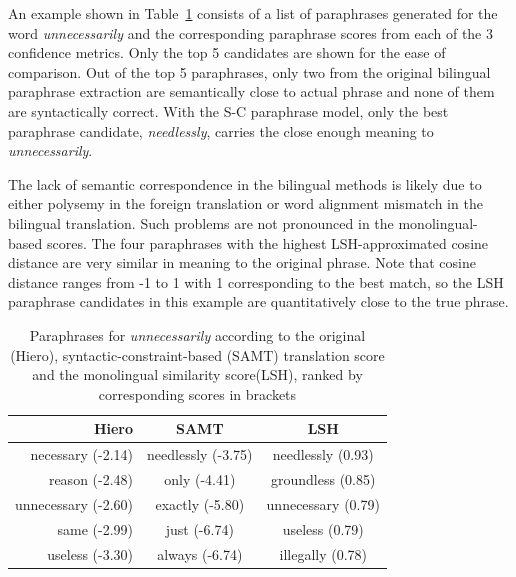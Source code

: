\documentclass[11pt]{article}
\begin{document}
An example shown in Table~\ref{table1} consists of a list of paraphrases generated for the word  {\em unnecessarily} and the corresponding paraphrase scores from each of the 3 confidence metrics. Only the top 5 candidates are shown for the ease of comparison. Out of the top 5 paraphrases, only two from the original bilingual paraphrase extraction are semantically close to actual phrase and none of them are syntactically correct. With the S-C paraphrase model, only the best paraphrase candidate, {\em needlessly}, carries the close enough meaning to {\em unnecessarily}. 

The lack of semantic correspondence in the bilingual methods is likely due to either polysemy in the foreign translation or word alignment mismatch in the bilingual translation. Such problems are not pronounced in the monolingual-based scores. The four paraphrases with the highest LSH-approximated cosine distance are very similar in meaning to the original phrase. Note that cosine distance ranges from -1 to 1 with 1 corresponding to the best match, so the LSH paraphrase candidates in this example are quantitatively close to the true phrase.

\begin{table}[h]
\begin{center}
\begin{tabular}{rcc}%
\hline\hline \bf \footnotesize Hiero & \bf \footnotesize SAMT & \bf \footnotesize LSH \\ \hline
{\scriptsize necessary (-2.14)} & {\scriptsize needlessly (-3.75)} & {\scriptsize needlessly (0.93)} \\
{\scriptsize reason (-2.48)} & {\scriptsize only (-4.41)} & {\scriptsize groundless (0.85)} \\
{\scriptsize unnecessary (-2.60)}& {\scriptsize exactly (-5.80)}& {\scriptsize unnecessary (0.79)}\\
{\scriptsize same (-2.99)} & {\scriptsize just (-6.74)} & {\scriptsize useless (0.79)} \\
{\scriptsize useless (-3.30)}& {\scriptsize always (-6.74)}& {\scriptsize illegally (0.78)}\\
\hline
\end{tabular}
\end{center}
\caption{Paraphrases for {\em unnecessarily} according to the original (Hiero), syntactic-constraint-based (SAMT) translation score and the monolingual similarity score(LSH), ranked by corresponding scores in brackets}
\label{table1}
\end{table}
\end{document}
